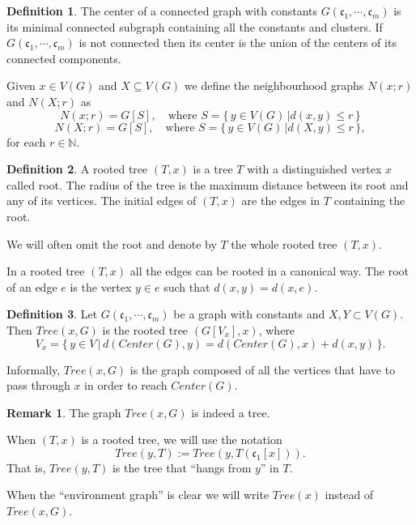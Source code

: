 \documentclass[11pt,notitlepage]{report}
\theoremstyle{definition}
\newtheorem{definition}{Definition}[chapter]
\newtheorem{remark}{Remark}[chapter]
\newcommand{\cc}{\mathfrak{c}}
\newcommand{\N}{\mathbb{N}}
\newcommand{\clist}{\mathfrak{c}_{1}, \cdots, \mathfrak{c}_m}
\begin{document}
\begin{definition}
	The center of a connected graph with constants $G(\clist)$ is its minimal 
	connected subgraph containing all the constants and clusters. If $G(\clist)$
	is not connected then its center is the union of the centers of its connected
	components.   
\end{definition}


Given $x\in V(G)$ and $X\subseteq V(G)$ we define the
neighbourhood graphs $N(x;r)$ and $N(X;r)$ as
\[ N(x;r)= G[S], \quad \text{where } S=\{\, y\in V(G) \, | d(x,y)\leq r \, \} \]
\[ N(X;r)= G[S], \quad \text{where } S=\{\, y\in V(G) \, | d(X,y)\leq r \, \}, \]
for each $r\in \N$.


\begin{definition}
	 A rooted tree $(T,x)$ is a tree $T$ with a distinguished vertex 
	 $x$ called root.
	 The radius of the tree is the 
	 maximum distance between its root and any
	 of its vertices.  
	 The initial edges of $(T,x)$ are the edges in $T$ containing
	 the root.
\end{definition}

We will often omit the root and denote by $T$ the whole rooted tree $(T,x)$.\par 

In a rooted tree $(T,x)$ all the edges can be rooted in a canonical way. 
The root of an edge $e$ is the vertex $y\in e$ such that $d(x,y)=d(x,e)$.

\begin{definition}
	Let $G(\clist)$ be a graph with constants and $X,Y\subset V(G)$. Then
	$Tree(x,G)$ is the rooted tree $(G[V_x],x)$, where
	\[ V_x= \{\, y\in V \, | \, d(Center(G),y)= d(Center(G),x)+ d(x,y) \,	 \}. \]
\end{definition}

Informally, $Tree(x,G)$ is the graph composed of all the vertices that
have to pass through $x$ in order to reach $Center(G)$.

\begin{remark}
	The graph $Tree(x,G)$ is indeed a tree.
\end{remark}

When $(T,x)$ is a rooted tree, we will use the notation
\[ Tree(y, T):= Tree(y,T(\cc_1[x])). \]
That is, $Tree(y,T)$ is the tree that ``hangs from $y$'' in
$T$.

When the ``environment graph'' is clear we will write $Tree(x)$
instead of $Tree(x,G)$. 
\end{document}
